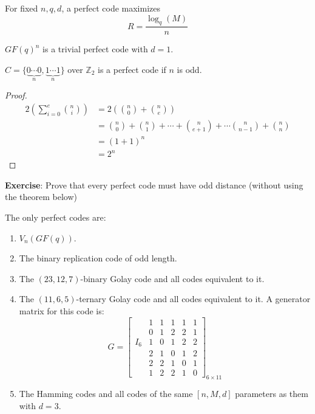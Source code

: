 For fixed $ n,q,d $, a perfect code maximizes
\[ R=\frac{\log_q(M)}{n} \]
\begin{exbox}
    \begin{example}
        $ GF(q)^n $ is a trivial perfect code with $ d=1 $.

        $ C=\{\underbrace{0\cdots 0}_{n},\underbrace{1\cdots 1}_{n}\} $ over $ \mathbb{Z}_2 $
        is a perfect code if $ n $ is odd.
    \end{example}
\end{exbox}

\begin{proof}
    \begin{align*}
        2\left( \sum\limits_{i=0}^{e} \binom{n}{i} \right)
         & =2\left( \binom{n}{0}+\binom{n}{e} \right)                                         \\
         & =\binom{n}{0}+\binom{n}{1}+\cdots+\binom{n}{e+1}+\cdots\binom{n}{n-1}+\binom{n}{n} \\
         & =(1+1)^n                                                                           \\
         & =2^n
    \end{align*}
\end{proof}

\textbf{Exercise}: Prove that every perfect code must have odd distance
(without using the theorem below)

\begin{thmbox}
    \begin{theorem}[Tietäväinen, 1973]
        The only perfect codes are:
        \begin{enumerate}[label=(\arabic*)]
            \item $ V_n(GF(q)) $.
            \item The binary replication code of odd length.
            \item The $ (23,12,7) $-binary Golay code and all codes equivalent to it.
            \item The $ (11,6,5) $-ternary Golay code and all codes equivalent to it.
                  A generator matrix for this code is:
                  \[ G=
                      \left[\begin{array}{c|ccccc}
                                  & 1 & 1 & 1 & 1 & 1 \\
                                  & 0 & 1 & 2 & 2 & 1 \\
                              I_6 & 1 & 0 & 1 & 2 & 2 \\
                                  & 2 & 1 & 0 & 1 & 2 \\
                                  & 2 & 2 & 1 & 0 & 1 \\
                                  & 1 & 2 & 2 & 1 & 0
                          \end{array}\right]_{6\times{} 11} \]
            \item The Hamming codes and all codes of the same $ [n,M,d] $ parameters as them
                  with $ d=3 $.
        \end{enumerate}
    \end{theorem}
\end{thmbox}

